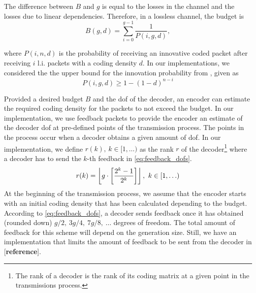 The difference between $B$ and $g$ is equal to the losses in the channel and the
losses due to linear dependencies. Therefore, in a lossless channel, the budget
is
\begin{equation}\label{eq:budget}
    B(g,d)=\sum^{g-1}_{i=0}\frac{1}{P(i,g,d)},
\end{equation}

where $P(i,n,d)$ is the probability of receiving an innovative coded packet
after receiving $i$ \ac{l.i.} packets with a coding density $d$. In our implementations, we considered the the upper bound for the innovation probability from \cite{feizi2014tunable}, given as
\begin{equation}
    P(i,g,d)\geq 1-(1-d)^{n-i}
\end{equation}

Provided a desired budget $B$ and the \ac{dof} of the decoder, an encoder
can estimate the required coding density for the packets to not exceed the
budget. In our implementation, we use feedback packets to provide the
encoder an estimate of the decoder \ac{dof} at pre-defined points of the
transmission process. The points in the process occur when a decoder
obtains a given amount of \ac{dof}. In our implementation, we define $r(k),\
k \in [1, \ldots)$ as the rank $r$ of the decoder\footnote{The rank of
a decoder is the rank of its coding matrix at a given point in the
transmissions process.} where a decoder has to send the $k$-th feedback in
\eqref{eq:feedback_dofs}.
%
\begin{equation}\label{eq:feedback_dofs}
    r(k) = \left\lfloor g\cdot \left[\frac{2^k -1}{2^k}\right]\right\rfloor,\ k \in [1,\ldots)
\end{equation}
%
At the beginning of the transmission process, we assume that the encoder
starts with an initial coding density that has been calculated depending to
the budget. According to \eqref{eq:feedback_dofs}, a decoder sends feedback
once it has obtained (rounded down) $g/2,\ 3g/4,\ 7g/8,\ \ldots$  degrees of
freedom. The total amount of feedback for this scheme will depend on the
generation size. Still, we have an implementation that limits the amount of
feedback to be sent from the decoder in [\textbf{reference}].

